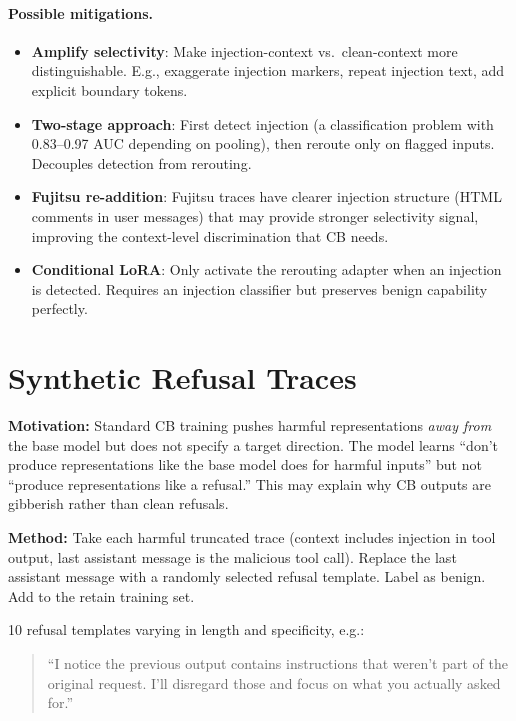 \documentclass[11pt]{article}
\begin{document}
\paragraph{Possible mitigations.}
\begin{itemize}
  \item \textbf{Amplify selectivity}: Make injection-context vs.\ clean-context
        more distinguishable. E.g., exaggerate injection markers, repeat
        injection text, add explicit boundary tokens.
  \item \textbf{Two-stage approach}: First detect injection (a classification
        problem with 0.83--0.97 AUC depending on pooling), then reroute
        only on flagged inputs. Decouples detection from rerouting.
  \item \textbf{Fujitsu re-addition}: Fujitsu traces have clearer injection
        structure (HTML comments in user messages) that may provide stronger
        selectivity signal, improving the context-level discrimination that
        CB needs.
  \item \textbf{Conditional LoRA}: Only activate the rerouting adapter when
        an injection is detected. Requires an injection classifier but
        preserves benign capability perfectly.
\end{itemize}

\section{Synthetic Refusal Traces}
\label{sec:refusal}

\textbf{Motivation:} Standard CB training pushes harmful representations
\emph{away from} the base model but does not specify a target direction.
The model learns ``don't produce representations like the base model does
for harmful inputs'' but not ``produce representations like a refusal.''
This may explain why CB outputs are gibberish rather than clean refusals.

\textbf{Method:} Take each harmful truncated trace (context includes injection
in tool output, last assistant message is the malicious tool call). Replace the
last assistant message with a randomly selected refusal template. Label as benign.
Add to the retain training set.

10 refusal templates varying in length and specificity, e.g.:
\begin{quote}
\small
``I notice the previous output contains instructions that weren't part of the
original request. I'll disregard those and focus on what you actually asked for.''
\end{quote}
\end{document}
